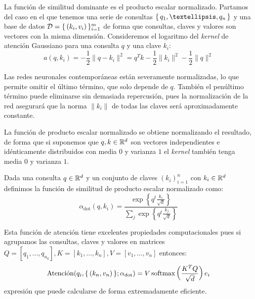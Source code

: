 La función de similitud dominante es el producto escalar normalizado. Partamos del caso en el que tenemos una serie de consultas \( \Set{ q_1, …, q_n} \) y una base de datos \( \mathcal{D} = \{\,(k_i, v_i)\,\}_{i = 1}^m \) de forma que consultas, claves y valores son vectores con la misma dimensión. Consideremos el logaritmo del \textit{kernel} de atención Gaussiano para una consulta \( q \) y una clave \( k_{i} \):
\[
    a(q, k_i) = -\frac{1}{2} \|q - k_i\|^2  = q^T k - \frac{1}{2} \| k_i \|^2 - \frac{1}{2} \| q \|^2
\]

Las redes neuronales contemporáneas están severamente normalizadas, lo que permite omitir el último término, que solo depende de \( q \). También el penúltimo término puede eliminarse sin demasiada repercusión, pues la normalización de la red asegurará que la norma \( \| k_i \| \) de todas las claves será aproximadamente constante.

La función de producto escalar normalizado se obtiene normalizando el resultado, de forma que si suponemos que \( q, k \in \mathbb{R}^{d} \) son vectores independientes e idénticamente distribuidos con media \( 0 \) y varianza \( 1 \) el \textit{kernel} también tenga media \( 0 \) y varianza \( 1 \).

\begin{definition}
Dada una consulta \( q \in \mathbb{R}^{d}\) y un conjunto de claves \( (k_i)_{i = 1}^n \) con \( k_i \in \mathbb{R}^{d} \) definimos la función de similitud de producto escalar normalizado como:
\[
    \alpha_\text{dot}(q, k_{i}) = \frac{\exp \left\{q^t \frac{k_{i}}{\sqrt{d}} \right\}}{\sum_j \exp \left\{ q^t \frac{k_{j}}{\sqrt{d}} \right\}}
\]  
\end{definition}

Esta función de atención tiene excelentes propiedades computacionales pues si agrupamos las consultas, claves y valores en matrices \( Q = [q_1, …, q_{n_q}], K = [k_1, …, k_n], V = [v_1, …, v_n] \) entonces:
\begin{equation} \label{eq:dot_product}
    \operatorname{Atenci\acute{o}n}(q_i, \{\, (k_{n}, v_{n})\,\}; \alpha_\text{dot}) = V \operatorname{softmax} \left( \frac{K^T Q}{\sqrt{d}} \right) e_i
\end{equation}
expresión que puede calcularse de forma extremadamente eficiente.


